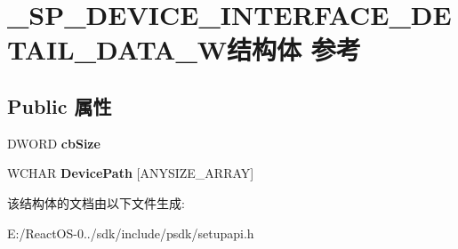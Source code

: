 \hypertarget{struct___s_p___d_e_v_i_c_e___i_n_t_e_r_f_a_c_e___d_e_t_a_i_l___d_a_t_a___w}{}\section{\+\_\+\+S\+P\+\_\+\+D\+E\+V\+I\+C\+E\+\_\+\+I\+N\+T\+E\+R\+F\+A\+C\+E\+\_\+\+D\+E\+T\+A\+I\+L\+\_\+\+D\+A\+T\+A\+\_\+\+W结构体 参考}
\label{struct___s_p___d_e_v_i_c_e___i_n_t_e_r_f_a_c_e___d_e_t_a_i_l___d_a_t_a___w}
\subsection*{Public 属性}
\begin{DoxyCompactItemize}
\item 
\mbox{\label{struct___s_p___d_e_v_i_c_e___i_n_t_e_r_f_a_c_e___d_e_t_a_i_l___d_a_t_a___w_aadd8c06a10e7b742c5e34dcd739e167b}} 
D\+W\+O\+RD {\bfseries cb\+Size}
\item 
\mbox{\label{struct___s_p___d_e_v_i_c_e___i_n_t_e_r_f_a_c_e___d_e_t_a_i_l___d_a_t_a___w_a809e73875b5472cb477ded08d35a683b}} 
W\+C\+H\+AR {\bfseries Device\+Path} \mbox{[}A\+N\+Y\+S\+I\+Z\+E\+\_\+\+A\+R\+R\+AY\mbox{]}
\end{DoxyCompactItemize}


该结构体的文档由以下文件生成\+:\begin{DoxyCompactItemize}
\item 
E\+:/\+React\+O\+S-\/0../sdk/include/psdk/setupapi.\+h\end{DoxyCompactItemize}
